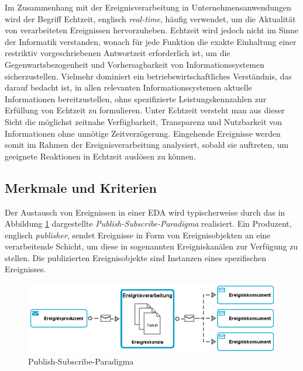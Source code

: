 Im Zusammenhang mit der Ereignisverarbeitung in Unternehmensanwendungen wird der Begriff Echtzeit, englisch \textit{real-time}, häufig verwendet, um die Aktualität von verarbeiteten Ereignissen hervorzuheben.
\cite{Bruns.2015}
Echtzeit wird jedoch nicht im Sinne der Informatik verstanden, wonach für jede Funktion die exakte Einhaltung einer restriktiv vorgeschriebenen Antwortzeit erforderlich ist, um die Gegenwartsbezogenheit und Vorhersagbarkeit von Informationssystemen sicherzustellen.
Vielmehr dominiert ein betriebswirtschaftliches Verständnis, das darauf bedacht ist, in allen relevanten Informationssystemen aktuelle Informationen bereitzustellen, ohne spezifizierte Leistungskennzahlen zur Erfüllung von Echtzeit zu formulieren.
\cite{Worn.2005}
Unter Echtzeit versteht man aus dieser Sicht die möglichst zeitnahe Verfügbarkeit, Transparenz und Nutzbarkeit von Informationen ohne unnötige Zeitverzögerung.
Eingehende Ereignisse werden somit im Rahmen der Ereignisverarbeitung analysiert, sobald sie auftreten, um geeignete Reaktionen in Echtzeit auslösen zu können.
\cite{Grauer.2010}

\subsection{Merkmale und Kriterien}
Der Austausch von Ereignissen in einer \ac{EDA} wird typischerweise durch das in Abbildung \ref{fig:Publish-Subscribe-Paradigma} dargestellte \textit{Publish-Subscribe-Paradigma} realisiert. 
Ein Produzent, englisch \textit{publisher}, sendet Ereignisse in Form von Ereignisobjekten an eine verarbeitende Schicht, um diese in sogenannten Ereigniskanälen zur Verfügung zu stellen. Die publizierten Ereignisobjekte sind Instanzen eines spezifischen Ereignisses. \cite{Metz.2014}

\begin{figure}[H]
	\centering 
    \includegraphics[width=\textwidth]{img/pubsub.png}	
    \caption[Publish-Subscribe-Paradigma]
    {Publish-Subscribe-Paradigma \protect\footnotemark}
    \label{fig:Publish-Subscribe-Paradigma}
\end{figure}


